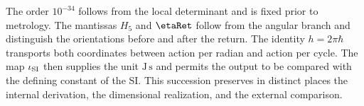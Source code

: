 \begin{statusbox}[title={Proof hierarchy for the Planck constant}]
The order \(10^{-34}\) follows from the local determinant and is fixed prior to
metrology. The mantissas \(H_5\) and \(\etaRet\) follow from the angular branch
and distinguish the orientations before and after the return. The identity
\(h=2\pi\hbar\) transports both coordinates between action per radian and action
per cycle. The map \(\iota_{\rm SI}\) then supplies the unit
\(\mathrm{J\,s}\) and permits the output to be compared with the defining constant
of the SI. This succession preserves in distinct places the internal derivation,
the dimensional realization, and the external comparison.
\end{statusbox}
